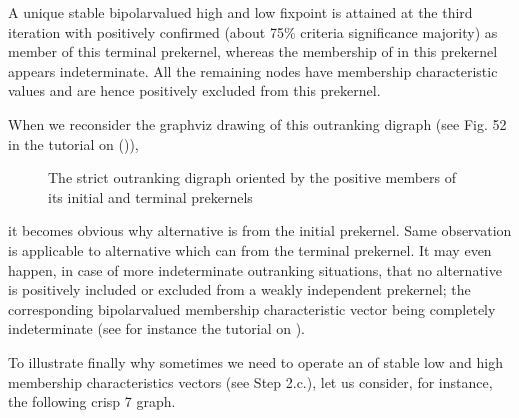 \documentclass[a4paper,12pt,english]{sphinxhowto}
\let\sphinxpxdimen\pdfpxdimen\else\newdimen\sphinxpxdimen
\begin{document}
\sphinxAtStartPar
A unique stable bipolar\sphinxhyphen{}valued high and low fixpoint is attained at the third iteration with  positively confirmed (about 75\% criteria significance majority) as member of this terminal prekernel, whereas the membership of  in this prekernel appears indeterminate. All the remaining nodes have  membership characteristic values and are hence positively excluded from this prekernel.

\sphinxAtStartPar
When we reconsider the graphviz drawing of this outranking digraph (see Fig. 52  in the tutorial on {\hyperref[\detokenize{pearls:kernel-tutorial-label}]{}} ()),

\begin{figure}[H]
\centering
\capstart

\noindent\sphinxincludegraphics[width=300\sphinxpxdimen]{{bestWorstOrientation}.png}
\caption{The strict outranking digraph oriented by the positive members of its initial and terminal prekernels}\label{\detokenize{pearls:id105}}\end{figure}

\sphinxAtStartPar
it becomes obvious why alternative  is  from the initial prekernel. Same observation is applicable to alternative  which can  from the terminal prekernel. It may even happen, in case of more indeterminate outranking situations, that no alternative  is positively included or excluded from a weakly independent prekernel; the corresponding bipolar\sphinxhyphen{}valued membership characteristic vector being completely indeterminate (see for instance the tutorial on ).

\sphinxAtStartPar
To illustrate finally why sometimes we need to operate an  of  stable low and high membership characteristics vectors (see Step 2.c.), let us consider, for instance, the following crisp 7\sphinxhyphen{} graph.
\end{document}

